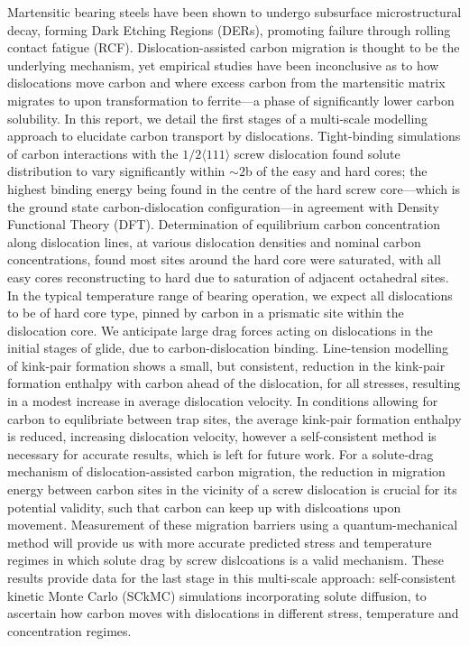 \documentclass[a4paper,11pt]{article}
\newenvironment*{abstract}{}{}
\numberwithin{equation}{chapter}
\numberwithin{listing}{chapter}
\begin{document}
 \begin{abstract}

Martensitic bearing steels have been shown to undergo subsurface microstructural decay,
forming Dark Etching Regions (DERs), promoting failure through rolling contact fatigue
(RCF). Dislocation-assisted carbon migration is thought to be the underlying mechanism,
yet empirical studies have been inconclusive as to how dislocations move carbon and
where excess carbon from the martensitic matrix migrates to upon transformation to
ferrite---a phase of significantly lower carbon solubility. In this report, we detail
the first stages of a multi-scale modelling approach to elucidate carbon transport by
dislocations. Tight-binding simulations of carbon interactions with the $1/2\langle 111
\rangle$ screw dislocation found solute distribution to vary significantly within
$\sim2$b of the easy and hard cores; the highest binding energy being found in the
centre of the hard screw core---which is the ground state carbon-dislocation
configuration---in agreement with Density Functional Theory (DFT). Determination of
equilibrium carbon concentration along dislocation lines, at various dislocation
densities and nominal carbon concentrations, found most sites around the hard core were
saturated, with all easy cores reconstructing to hard due to saturation of adjacent
octahedral sites. In the typical temperature range of bearing operation, we expect all
dislocations to be of hard core type, pinned by carbon in a prismatic site within the
dislocation core. We anticipate large drag forces acting on dislocations in the initial
stages of glide, due to carbon-dislocation binding.  Line-tension modelling of kink-pair
formation shows a small, but consistent, reduction in the kink-pair formation enthalpy
with carbon ahead of the dislocation, for all stresses, resulting in a modest increase
in average dislocation velocity. In conditions allowing for carbon to equlibriate
between trap sites, the average kink-pair formation enthalpy is reduced, increasing
dislocation velocity, however a self-consistent method is necessary for accurate
results, which is left for future work. For a solute-drag mechanism of
dislocation-assisted carbon migration, the reduction in migration energy between carbon
sites in the vicinity of a screw dislocation is crucial for its potential validity, such that
carbon can keep up with dislcoations upon movement. Measurement of these migration barriers using a quantum-mechanical method will provide us with more accurate predicted stress and temperature regimes in which solute drag by screw dislcoations is a valid mechanism. These results
provide data for the last stage in this multi-scale approach: self-consistent kinetic
Monte Carlo (SCkMC) simulations incorporating solute diffusion, to ascertain how carbon
moves with dislocations in different stress, temperature and concentration regimes.

 \end{abstract}
\end{document}
